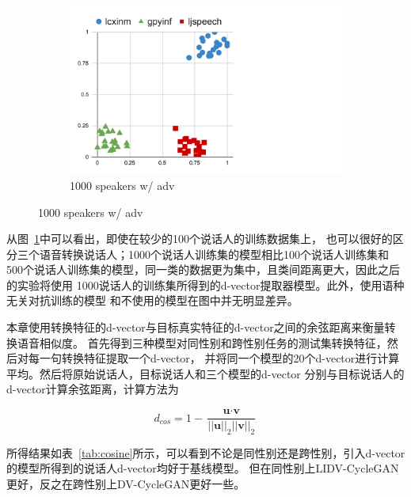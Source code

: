 \begin{figure}[!ht]
\begin{minipage}[b]{\linewidth}
\begin{subfigure}[b]{0.33\linewidth}
            \includegraphics[width=\linewidth,trim=0 0 200 0,clip]{figure/5_dvector23.pdf}
            \caption{1000 speakers w/ adv}
        \end{subfigure}   
    \end{minipage}
    \label{fig:dvectordis}
\end{figure}

从图~\ref{fig:dvectordis}中可以看出，即使在较少的100个说话人的训练数据集上，
也可以很好的区分三个语音转换说话人；1000个说话人训练集的模型相比100个说话人训练集和
500个说话人训练集的模型，同一类的数据更为集中，且类间距离更大，因此之后的实验将使用
1000说话人的训练集所得到的d-vector提取器模型。此外，使用语种无关对抗训练的模型
和不使用的模型在图中并无明显差异。

本章使用转换特征的d-vector与目标真实特征的d-vector之间的余弦距离来衡量转换语音相似度。
首先得到三种模型对同性别和跨性别任务的测试集转换特征，然后对每一句转换特征提取一个d-vector，
并将同一个模型的20个d-vector进行计算平均。然后将原始说话人，目标说话人和三个模型的d-vector
分别与目标说话人的d-vector计算余弦距离，计算方法为

\begin{equation}
    d_{cos} = 1-\frac{\textbf{u} \cdot \textbf{v} }{\left| \left| \textbf{u}\right| \right|_2 \left| \left| \textbf{v}\right| \right|_2}
\end{equation}

所得结果如表~\ref{tab:cosine}所示，可以看到不论是同性别还是跨性别，引入d-vector的模型所得到的说话人d-vector均好于基线模型。
但在同性别上LIDV-CycleGAN更好，反之在跨性别上DV-CycleGAN更好一些。





